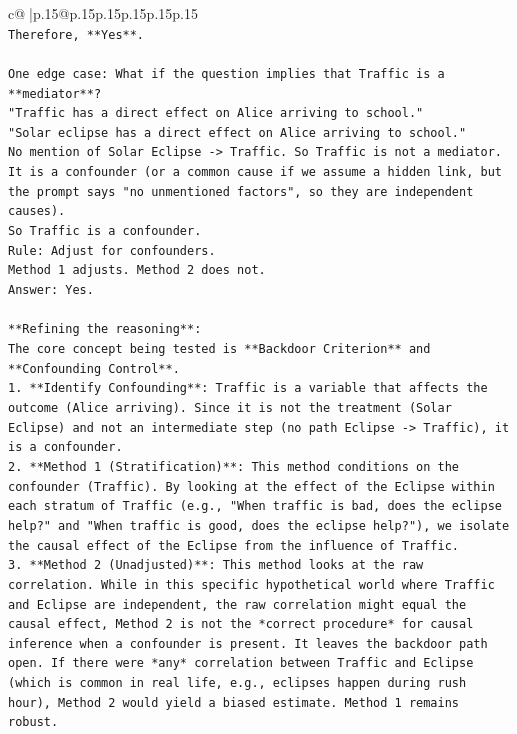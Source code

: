 \documentclass{article}
\begin{document}
{\begin{supertabular}{c@{$\;$}|p{.15\linewidth}@{}p{.15\linewidth}p{.15\linewidth}p{.15\linewidth}p{.15\linewidth}p{.15\linewidth}}
{{{\\ 
\texttt{Therefore, **Yes**.} \\
\\ 
\texttt{One edge case: What if the question implies that Traffic is a **mediator**?} \\
\texttt{"Traffic has a direct effect on Alice arriving to school."} \\
\texttt{"Solar eclipse has a direct effect on Alice arriving to school."} \\
\texttt{No mention of Solar Eclipse {-}> Traffic. So Traffic is not a mediator. It is a confounder (or a common cause if we assume a hidden link, but the prompt says "no unmentioned factors", so they are independent causes).} \\
\texttt{So Traffic is a confounder.} \\
\texttt{Rule: Adjust for confounders.} \\
\texttt{Method 1 adjusts. Method 2 does not.} \\
\texttt{Answer: Yes.} \\
\\ 
\texttt{**Refining the reasoning**:} \\
\texttt{The core concept being tested is **Backdoor Criterion** and **Confounding Control**.} \\
\texttt{1.  **Identify Confounding**: Traffic is a variable that affects the outcome (Alice arriving). Since it is not the treatment (Solar Eclipse) and not an intermediate step (no path Eclipse {-}> Traffic), it is a confounder.} \\
\texttt{2.  **Method 1 (Stratification)**: This method conditions on the confounder (Traffic). By looking at the effect of the Eclipse within each stratum of Traffic (e.g., "When traffic is bad, does the eclipse help?" and "When traffic is good, does the eclipse help?"), we isolate the causal effect of the Eclipse from the influence of Traffic.} \\
\texttt{3.  **Method 2 (Unadjusted)**: This method looks at the raw correlation. While in this specific hypothetical world where Traffic and Eclipse are independent, the raw correlation might equal the causal effect, Method 2 is not the *correct procedure* for causal inference when a confounder is present. It leaves the backdoor path open. If there were *any* correlation between Traffic and Eclipse (which is common in real life, e.g., eclipses happen during rush hour), Method 2 would yield a biased estimate. Method 1 remains robust.} \\
}}}
\end{supertabular}}
\end{document}
